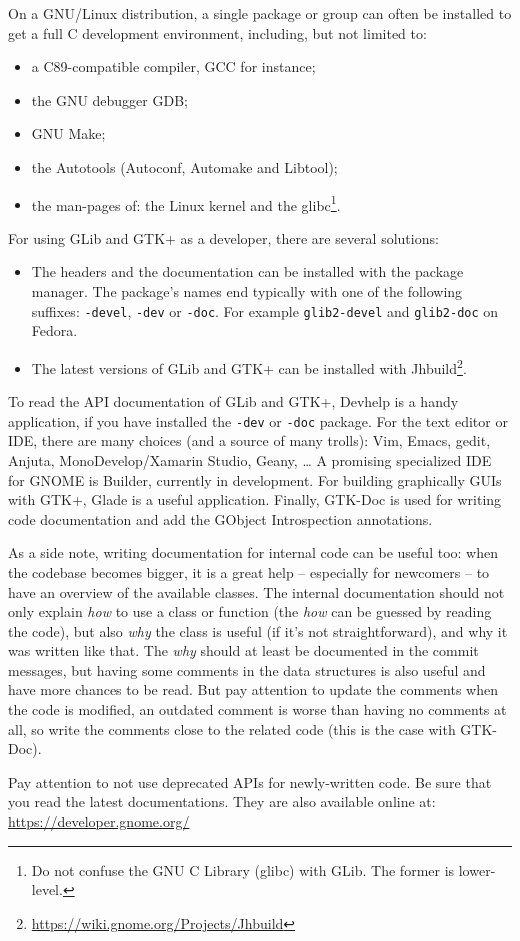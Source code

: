 On a GNU/Linux distribution, a single package or group can often be installed to get a full C development environment, including, but not limited to:
\begin{itemize}
  \item a C89-compatible compiler, GCC for instance;
  \item the GNU debugger GDB;
  \item GNU Make;
  \item the Autotools (Autoconf, Automake and Libtool);
  \item the man-pages of: the Linux kernel and the glibc\footnote{Do not confuse the GNU C Library (glibc) with GLib. The former is lower-level.}.
\end{itemize}

For using GLib and GTK+ as a developer, there are several solutions:
\begin{itemize}
  \item The headers and the documentation can be installed with the package manager. The package's names end typically with one of the following suffixes: \texttt{-devel}, \texttt{-dev} or \texttt{-doc}. For example \texttt{glib2-devel} and \texttt{glib2-doc} on Fedora.
  \item The latest versions of GLib and GTK+ can be installed with Jhbuild\footnote{\url{https://wiki.gnome.org/Projects/Jhbuild}}.
\end{itemize}

To read the API documentation of GLib and GTK+, Devhelp is a handy application, if you have installed the \texttt{-dev} or \texttt{-doc} package. For the text editor or IDE, there are many choices (and a source of many trolls): Vim, Emacs, gedit, Anjuta, MonoDevelop/Xamarin Studio, Geany, … A promising specialized IDE for GNOME is Builder, currently in development. For building graphically GUIs with GTK+, Glade is a useful application. Finally, GTK-Doc is used for writing code documentation and add the GObject Introspection annotations.

As a side note, writing documentation for internal code can be useful too: when the codebase becomes bigger, it is a great help -- especially for newcomers -- to have an overview of the available classes. The internal documentation should not only explain \emph{how} to use a class or function (the \emph{how} can be guessed by reading the code), but also \emph{why} the class is useful (if it's not straightforward), and why it was written like that. The \emph{why} should at least be documented in the commit messages, but having some comments in the data structures is also useful and have more chances to be read. But pay attention to update the comments when the code is modified, an outdated comment is worse than having no comments at all, so write the comments close to the related code (this is the case with GTK-Doc).

Pay attention to not use deprecated APIs for newly-written code. Be sure that you read the latest documentations. They are also available online at:\\
\url{https://developer.gnome.org/}
